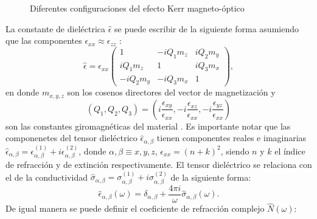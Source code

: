 \begin{figure}[!hbt]
	\centering
   \caption[Configuraciones de Efecto Kerr magneto-\'optico.]{Diferentes configuraciones del efecto Kerr magneto-\'optico}
   \label{Kerr:fig:Conf}
\end{figure}
\newline
La constante de diel\'ectrica $\hat{\epsilon}$ se puede escribir de la siguiente forma asumiendo que las componentes $\epsilon_{xx} \approx \epsilon_{zz}$ \cite{You_1996}:
\begin{equation}
\hat{\epsilon}= \epsilon_{xx}
\begin{pmatrix}
1         & -i Q_1 m_z & i Q_2 m_y \\
i Q_1 m_z & 1          &  i Q_3 m_x\\
-i Q_2 m_y&-i Q_3 m_x  & 1
\end{pmatrix}
\label{Kerr:ec:consDiel},
\end{equation}
en donde $m_{x,y,z}$ son los cosenos directores del vector de magnetizaci\'on y
\begin{equation*}
\left(Q_1, Q_2, Q_3\right)= \left(i \frac{\epsilon_{xy}}{\epsilon_{xx}},-i \frac{\epsilon_{xz}}{\epsilon_{xx}}, -i \frac{\epsilon_{yz}}{\epsilon_{xx}} \right)
\end{equation*}
son las constantes giromagn\'eticas del material \cite{mo_2004,You_1996}. Es importante notar que las componenetes del tensor diel\'ectrico $\hat{\epsilon}_{\alpha, \beta}$ tienen componentes reales e imaginarias $\hat{\epsilon}_{\alpha, \beta} = \epsilon_{\alpha, \beta}^{(1)} +i\epsilon_{\alpha, \beta}^{(2)} $, donde $\alpha,\beta \equiv x,y,z$, $\epsilon_{xx}= (n+k)^2$,  siendo $n$ y $k$ el \'indice de refracci\'on y de extinci\'on respectivamente. El tensor diel\'ectrico se relaciona con el de la conductividad $\hat{\sigma}_{\alpha, \beta} = \sigma_{\alpha, \beta}^{(1)} +i\sigma_{\alpha, \beta}^{(2)} $ de la siguiente forma:
\begin{equation}
\hat{\epsilon}_{\alpha,\beta}(\omega)= \delta_{\alpha,\beta}+ \frac{4 \pi i}{\omega}\hat{\sigma}_{\alpha,\beta}(\omega) \label{Kerr:ec:relES}.
\end{equation}
De igual manera se puede definir el coeficiente de refracci\'on complejo $\hat{N}(\omega)$:
